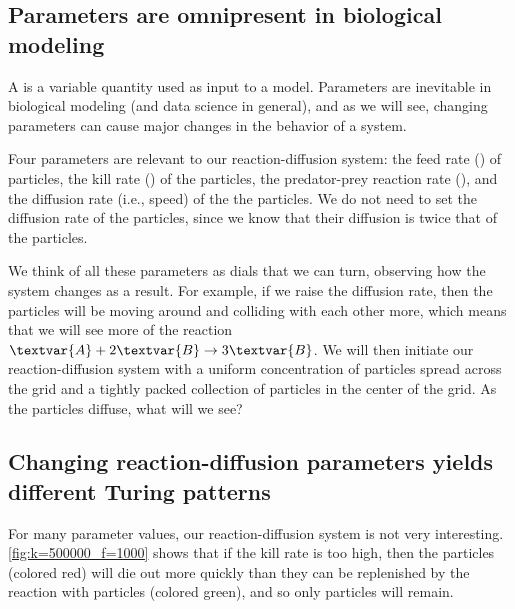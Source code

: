 \subsection{Parameters are omnipresent in biological modeling}

A  is a variable quantity used as input to a model. Parameters are inevitable in biological modeling (and data science in general), and as we will see, changing parameters can cause major changes in the behavior of a system.

Four parameters are relevant to our reaction-diffusion system: the feed rate () of  particles, the kill rate () of the  particles, the predator-prey reaction rate (), and the diffusion rate (i.e., speed) of the the  particles. We do not need to set the diffusion rate of the  particles, since we know that their diffusion is twice that of the  particles.

\begin{qbox}\end{qbox}

We think of all these parameters as dials that we can turn, observing how the system changes as a result. For example, if we raise the diffusion rate, then the particles will be moving around and colliding with each other more, which means that we will see more of the reaction $\textvar{A} + 2\textvar{B} \rightarrow 3\textvar{B}$. We will then initiate our reaction-diffusion system with a uniform concentration of  particles spread across the grid and a tightly packed collection of  particles in the center of the grid. As the  particles diffuse, what will we see?\\

\FloatBarrier
{}
\subsection{Changing reaction-diffusion parameters yields different Turing patterns}



For many parameter values, our reaction-diffusion system is not very interesting. \autoref{fig:k=500000_f=1000} shows that if the kill rate is too high, then the  particles (colored red) will die out more quickly than they can be replenished by the reaction with  particles (colored green), and so only  particles will remain.

